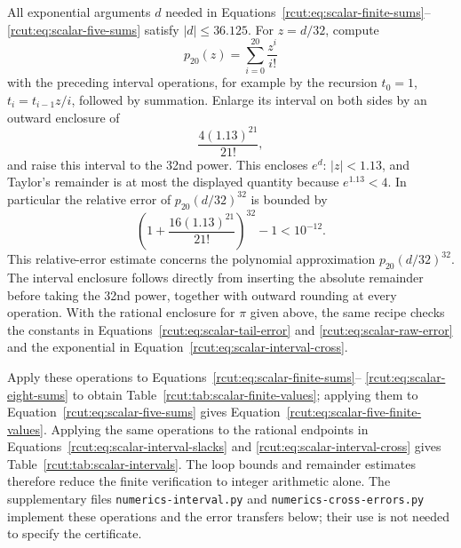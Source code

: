 All exponential arguments \(d\) needed in
Equations~\eqref{rcut:eq:scalar-finite-sums}--\eqref{rcut:eq:scalar-five-sums}
satisfy \(|d|\leq36.125\). For \(z=d/32\), compute
\[
 p_{20}(z)=\sum_{i=0}^{20}\frac{z^i}{i!}
\]
with the preceding interval operations, for example by the recursion
\(t_0=1\), \(t_i=t_{i-1}z/i\), followed by summation. Enlarge its
interval on both sides by an outward enclosure of
\[
 \frac{4(1.13)^{21}}{21!},
\]
and raise this interval to the 32nd power. This encloses \(e^d\):
\(|z|<1.13\), and Taylor's remainder is at most the displayed
quantity because \(e^{1.13}<4\). In particular the relative error
of \(p_{20}(d/32)^{32}\) is bounded by
\begin{equation}
 \left(1+\frac{16(1.13)^{21}}{21!}\right)^{32}-1<10^{-12}.
 \label{rcut:eq:scalar-exponential-error}
\end{equation}
This relative-error estimate concerns the polynomial approximation
\(p_{20}(d/32)^{32}\). The interval enclosure follows directly from
inserting the absolute remainder before taking the 32nd power, together
with outward rounding at every operation. With
the rational enclosure for \(\pi\) given above, the same recipe checks
the constants in Equations~\eqref{rcut:eq:scalar-tail-error} and
\eqref{rcut:eq:scalar-raw-error} and the exponential in
Equation~\eqref{rcut:eq:scalar-interval-cross}.

Apply these operations to Equations~\eqref{rcut:eq:scalar-finite-sums}--
\eqref{rcut:eq:scalar-eight-sums} to obtain
Table~\ref{rcut:tab:scalar-finite-values}; applying them to
Equation~\eqref{rcut:eq:scalar-five-sums} gives
Equation~\eqref{rcut:eq:scalar-five-finite-values}. Applying the same
operations to the rational endpoints in
Equations~\eqref{rcut:eq:scalar-interval-slacks} and
\eqref{rcut:eq:scalar-interval-cross} gives
Table~\ref{rcut:tab:scalar-intervals}. The loop bounds and remainder
estimates therefore reduce the finite verification to integer arithmetic
alone.
The supplementary files \nolinkurl{numerics-interval.py} and
\nolinkurl{numerics-cross-errors.py} implement these operations and the
error transfers below; their use is not needed to specify the
certificate.

